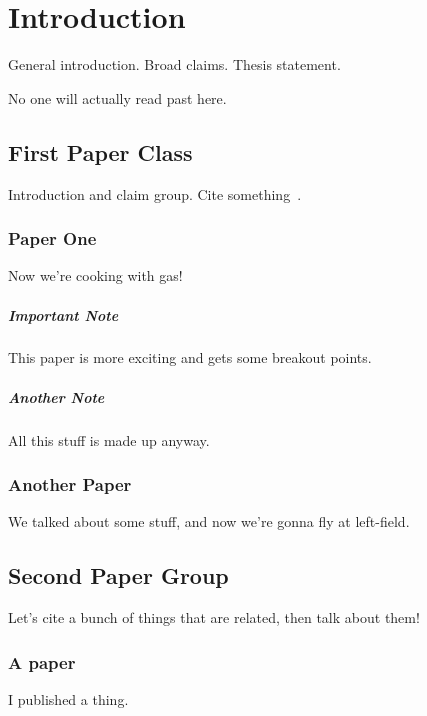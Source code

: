 



\chapter{Introduction}

General introduction. Broad claims. Thesis statement.

No one will actually read past here.

\section{First Paper Class}

Introduction and claim group. Cite something~\cite{weak-keys-12}.

\subsection{Paper One}

Now we're cooking with gas!

\paragraph{Important Note}
This paper is more exciting and gets some breakout points.

\paragraph{Another Note}
All this stuff is made up anyway.

\subsection{Another Paper}

We talked about some stuff, and now we're gonna fly at left-field.

\section{Second Paper Group}

Let's cite a bunch of things that are related, then talk about them!

\subsection{A paper}

I published a thing.

